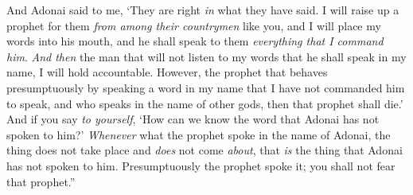 \begin{biblechapter}
\verse And Adonai said to me, ‘They are right \textit{in} what they have said.
\verse I will raise up a prophet for them \textit{from among their countrymen} like you, and I will place my words into his mouth, and he shall speak to them \textit{everything that I command him}.
\verse \textit{And then} the man that will not listen to my words that he shall speak in my name, I will hold accountable.
\verse However, the prophet that behaves presumptuously by speaking a word in my name that I have not commanded him to speak, and who speaks in the name of other gods, then that prophet shall die.’
\verse And if you say \textit{to yourself}, ‘How can we know the word that Adonai has not spoken to him?’
\verse \textit{Whenever} what the prophet spoke in the name of Adonai, the thing does not take place and \textit{does} not come \textit{about}, that \textit{is} the thing that Adonai has not spoken to him. Presumptuously the prophet spoke it; you shall not fear that prophet.”
\end{biblechapter}

